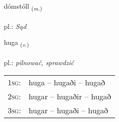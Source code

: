 \documentclass[frontgrid, backgrid]{flacards}\usepackage[]{graphicx}\usepackage[]{xcolor}
\begin{document}
\renewcommand{\flhead}{\vskip5pt \fboxsep=0pt {\small\bfseries\footnotesize Nafnorð | Noun}}
\renewcommand{\fcfoot}{\vskip5pt \fboxsep=0pt \hspace{2pt}{\small\bfseries\footnotesize 2K}}

\renewcommand{\blhead}{\vskip5pt {\small\bfseries\footnotesize Nafnorð | Noun }}
\renewcommand{\bcfoot}{\vskip5pt \hspace{2pt}{\small\bfseries\footnotesize 2K}}


{dómstóll \small{\textsubscript{(\textit{m.})}} \\[1ex] %
\textphonetic{[toumstoutl̥]} \\
pl.: \emph{Sąd} \\  [2ex]
\renewcommand*{\arraystretch}{0.8}
}

\renewcommand{\flhead}{\vskip5pt \fboxsep=0pt {\small\bfseries\footnotesize Sagnorð | Verb}}
\renewcommand{\fcfoot}{\vskip5pt \fboxsep=0pt \hspace{2pt}{\small\bfseries\footnotesize 2K}}

\renewcommand{\blhead}{\vskip5pt {\small\bfseries\footnotesize Sagnorð | Verb }}
\renewcommand{\bcfoot}{\vskip5pt \hspace{2pt}{\small\bfseries\footnotesize 2K}}


{huga \small{\textsubscript{(\textit{v.})}} \\[1ex] %
\textphonetic{[hʏːɣa]} \\
pl.: \emph{pilnować, sprawdzić} \\  [2ex]
\renewcommand*{\arraystretch}{0.8}
\begin{tabular}{p{1cm}l}
\textsc{1sg}: & huga -- hugaði -- hugað \\ 
\textsc{2sg}: & hugar -- hugaðir -- hugað \\ 
\textsc{3sg}: & hugar -- hugaði -- hugað \\ 
\end{tabular}
}
\end{document}
